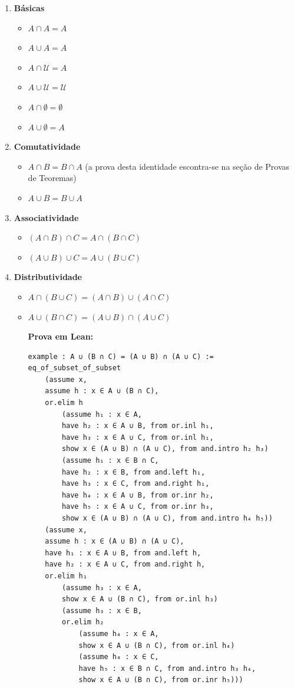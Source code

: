 \begin{enumerate}
\item{\textbf{Básicas}}
\begin{itemize}
\item $A \cap A = A$
\item $A \cup A = A$
\item $A \cap \mathcal U = A$
\item $A \cup \mathcal U = \mathcal U$
\item $A \cap \emptyset = \emptyset$
\item $A \cup \emptyset = A$
\end{itemize}

\item{\textbf{Comutatividade}}
\begin{itemize}
\item $A \cap B = B \cap A$ (a prova desta identidade escontra-se na seção de Provas de Teoremas)
\item $A \cup B = B \cup A$
\end{itemize}

\item{\textbf{Associatividade}}
\begin{itemize}
\item $(A \cap B) \cap C = A \cap (B \cap C)$
\item $(A \cup B) \cup C = A \cup (B \cup C)$
\end{itemize}

\item{\textbf{Distributividade}}
\begin{itemize}
\item $A \cap (B \cup C) = (A \cap B) \cup (A \cap C)$
\item $A \cup (B \cap C) = (A \cup B) \cap (A \cup C)$

\textbf{Prova em Lean:}
\begin{lstlisting}
example : A ∪ (B ∩ C) = (A ∪ B) ∩ (A ∪ C) :=
eq_of_subset_of_subset
    (assume x,
    assume h : x ∈ A ∪ (B ∩ C),
    or.elim h
        (assume h₁ : x ∈ A,
        have h₂ : x ∈ A ∪ B, from or.inl h₁,
        have h₃ : x ∈ A ∪ C, from or.inl h₁,
        show x ∈ (A ∪ B) ∩ (A ∪ C), from and.intro h₂ h₃)
        (assume h₁ : x ∈ B ∩ C,
        have h₂ : x ∈ B, from and.left h₁,
        have h₃ : x ∈ C, from and.right h₁,
        have h₄ : x ∈ A ∪ B, from or.inr h₂,
        have h₅ : x ∈ A ∪ C, from or.inr h₃,
        show x ∈ (A ∪ B) ∩ (A ∪ C), from and.intro h₄ h₅))
    (assume x,
    assume h : x ∈ (A ∪ B) ∩ (A ∪ C),
    have h₁ : x ∈ A ∪ B, from and.left h,
    have h₂ : x ∈ A ∪ C, from and.right h,
    or.elim h₁
        (assume h₃ : x ∈ A,
        show x ∈ A ∪ (B ∩ C), from or.inl h₃)
        (assume h₃ : x ∈ B,
        or.elim h₂
            (assume h₄ : x ∈ A,
            show x ∈ A ∪ (B ∩ C), from or.inl h₄)
            (assume h₄ : x ∈ C,
            have h₅ : x ∈ B ∩ C, from and.intro h₃ h₄,
            show x ∈ A ∪ (B ∩ C), from or.inr h₅))) \end{lstlisting}


\end{itemize}
\end{enumerate}
